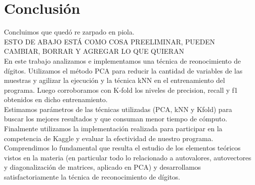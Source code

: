 \section{Conclusión}

Concluimos que quedó re zarpado en piola.\\



ESTO DE ABAJO ESTÁ COMO COSA PREELIMINAR, PUEDEN CAMBIAR, BORRAR Y AGREGAR LO QUE QUIERAN\\


En este trabajo analizamos e implementamos una técnica de reonocimiento de dígitos. Utilizamos el método PCA para reducir la cantidad de variables de las muestras y agilizar la ejecución y la técnica kNN en el entrenamiento del programa. Luego corroboramos con K-fold los niveles de precision, recall y f1 obtenidos en dicho entrenamiento.\\

Estimamos parámetros de las técnicas utilizadas (PCA, kNN y Kfold) para buscar los mejores resultados y que consuman menor tiempo de cómputo.\\

Finalmente utilizamos la implementación realizada para participar en la competencia de Kaggle y evaluar la efectividad de nuestro programa.\\

Comprendimos lo fundamental que resulta el estudio de los elementos teóricos vistos en la materia (en particular todo lo relacionado a autovalores, autovectores y diagonalización de matrices, aplicado en PCA) y desarrollamos satisfactoriamente la técnica de reconocimiento de dígitos.